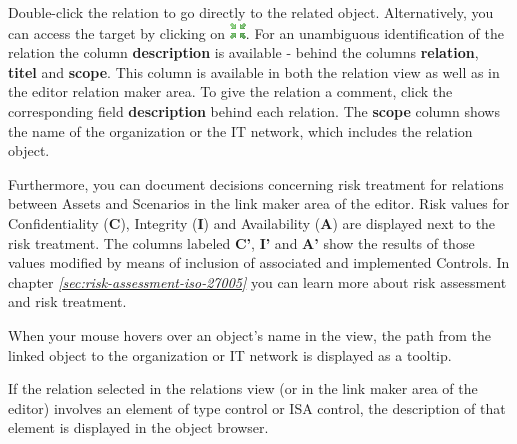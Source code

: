 \documentclass[a4paper,10pt]{book}
\begin{document}
Double-click the relation to go directly to the related object. Alternatively,
you can access the target by clicking on
\includegraphics[height=2ex]{Icon/Ziel.png}. For an unambiguous identification
of the relation the column \textbf{description} is available - behind the
columns \textbf{relation}, \textbf{titel} and \textbf{scope}. This column is
available in both the relation view as well as in the editor relation maker
area. To give the relation a comment, click the corresponding field
\textbf{description} behind each relation. The \textbf{scope} column shows the
name of the organization or the IT network, which includes the relation object.

Furthermore, you can document decisions concerning risk treatment for relations
between Assets and Scenarios in the link maker area of the editor. Risk values
for Confidentiality (\textbf{C}), Integrity (\textbf{I}) and Availability
(\textbf{A}) are displayed next to the risk treatment. The columns labeled
\textbf{C'}, \textbf{I'} and \textbf{A'} show the results of those values
modified by means of inclusion of associated and implemented Controls. In
chapter {\em \ref{sec:risk-assessment-iso-27005}
} you can learn more about risk
assessment and risk treatment.

When your mouse hovers over an object’s name in the view, the path from the
linked object to the organization or IT network is displayed as a tooltip.

If the relation selected in the relations view (or in the link maker area of the
editor) involves an element of type control or ISA control, the description of
that element is displayed in the object browser.
\end{document}
